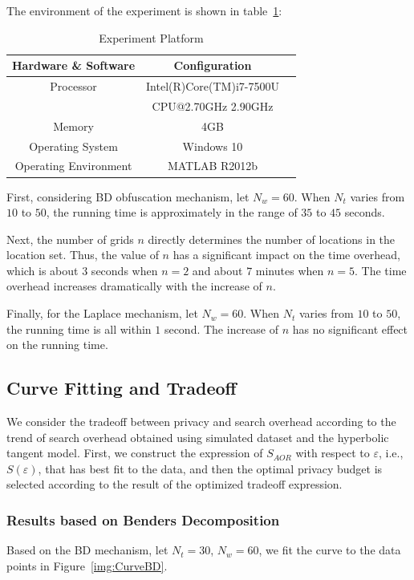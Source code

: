 The environment of the experiment is shown in table~\ref{tab:envi}:
\begin{table}
  \caption{Experiment Platform}
  \label{tab:envi}
  \begin{tabular}{ccl}
    \toprule
    Hardware \& Software & Configuration\\
    \midrule
    Processor & Intel(R)Core(TM)i7-7500U \\
              & CPU@2.70GHz 2.90GHz\\
    Memory & 4GB\\
    Operating System & Windows 10\\
    Operating Environment & MATLAB R2012b\\
  \bottomrule
\end{tabular}
\end{table}

First, considering BD obfuscation mechanism, let $N_w=60$. When $N_t$ varies from $10$ to $50$, the running time is approximately in the range of $35$ to $45$ seconds.

Next, the number of grids $n$ directly determines the number of locations in the location set. Thus, the value of $n$ has a significant impact on the time overhead, which is about $3$ seconds when $n=2$ and about $7$ minutes when $n=5$. The time overhead increases dramatically with the increase of $n$.

Finally, for the Laplace mechanism, let $N_w=60$. When $N_t$ varies from $10$ to $50$, the running time is all within $1$ second. The increase of $n$ has no significant effect on the running time.

\subsection{Curve Fitting and Tradeoff}
We consider the tradeoff between privacy and search overhead according to the trend of search overhead obtained using simulated dataset and the hyperbolic tangent model. First, we construct the expression of $S_{AOR}$ with respect to $\varepsilon$, i.e., $S(\varepsilon)$, that has best fit to the data, and then the optimal privacy budget is selected according to the result of the optimized tradeoff expression.

\subsubsection{Results based on Benders Decomposition}
Based on the BD mechanism, let $N_t=30$, $N_w=60$, we fit the curve to the data points in Figure~\ref{img:CurveBD}.

